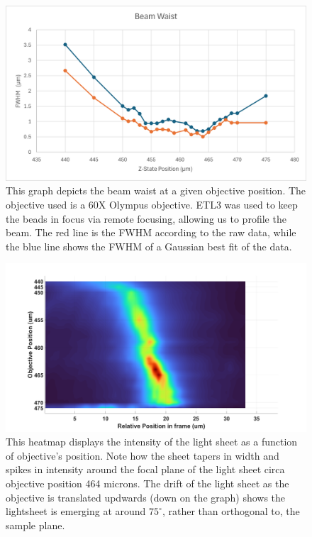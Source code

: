 \documentclass[11pt]{article}
\begin{document}
\begin{figure}
    \centering
    \includegraphics[scale=.75]{BeamWaist.png}
    \caption{This graph depicts the beam waist at a given objective position. The objective used is a 60X Olympus objective. ETL3 was used to keep the beads in focus via remote focusing, allowing us to profile the beam. The red line is the FWHM according to the raw data, while the blue line shows the FWHM of a Gaussian best fit of the data.}
\end{figure}
\begin{figure}
    \centering
    \includegraphics[width=\textwidth]{LS_Heatmap.png}
    \caption{This heatmap displays the intensity of the light sheet as a function of objective's position. Note how the sheet tapers in width and spikes in intensity around the focal plane of the light sheet circa objective position 464 microns. The drift of the light sheet as the objective is translated updwards (down on the graph) shows the lightsheet is emerging at around $75^\circ$, rather than orthogonal to, the sample plane.}
\end{figure}
\newpage
\printbibliography[heading=bibintoc]
\end{document}
